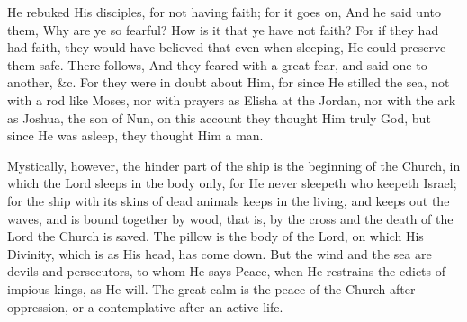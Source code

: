  He rebuked His disciples, for not having faith; for it goes on, And he said unto them, Why are ye so fearful? How is it that ye have not faith? For if they had had faith, they would have believed that even when sleeping, He could preserve them safe. There follows, And they feared with a great fear, and said one to another, \&c. For they were in doubt about Him, for since He stilled the sea, not with a rod like Moses, nor with prayers as Elisha at the Jordan, nor with the ark as Joshua, the son of Nun, on this account they thought Him truly God, but since He was asleep, they thought Him a man.

 Mystically, however, the hinder part of the ship is the beginning of the Church, in which the Lord sleeps in the body only, for He never sleepeth who keepeth Israel; for the ship with its skins of dead animals keeps in the living, and keeps out the waves, and is bound together by wood, that is, by the cross and the death of the Lord the Church is saved. The pillow is the body of the Lord, on which His Divinity, which is as His head, has come down. But the wind and the sea are devils and persecutors, to whom He says Peace, when He restrains the edicts of impious kings, as He will. The great calm is the peace of the Church after oppression, or a contemplative after an active life.

